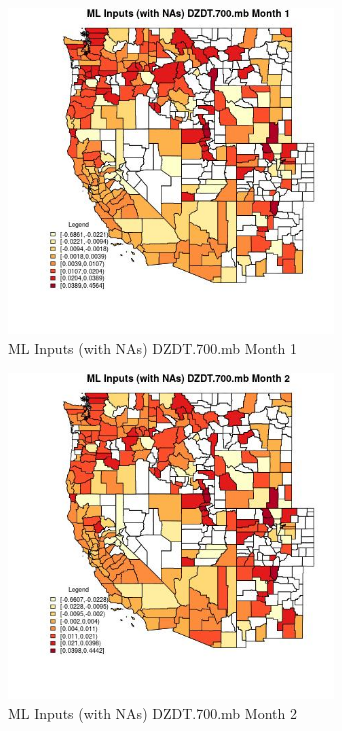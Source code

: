 \clearpage 

\begin{figure} 
\centering  
\includegraphics[width=0.77\textwidth]{Code_Outputs/Report_ML_input_PM25_Step4_part_e_de_duplicated_aves_compiled_2019-05-21wNAs_CountyDZDT700mbmedianMonth1.jpg} 
\caption{\label{fig:Report_ML_input_PM25_Step4_part_e_de_duplicated_aves_compiled_2019-05-21wNAsCountyDZDT700mbmedianMonth1}ML Inputs (with NAs) DZDT.700.mb Month 1} 
\end{figure} 
 

\begin{figure} 
\centering  
\includegraphics[width=0.77\textwidth]{Code_Outputs/Report_ML_input_PM25_Step4_part_e_de_duplicated_aves_compiled_2019-05-21wNAs_CountyDZDT700mbmedianMonth2.jpg} 
\caption{\label{fig:Report_ML_input_PM25_Step4_part_e_de_duplicated_aves_compiled_2019-05-21wNAsCountyDZDT700mbmedianMonth2}ML Inputs (with NAs) DZDT.700.mb Month 2} 
\end{figure} 
 


